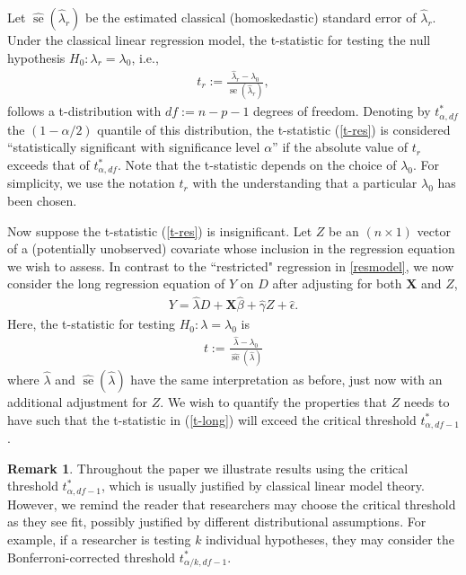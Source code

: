\documentclass[sts]{imsart}
\theoremstyle{plain}
\theoremstyle{definition}
\newtheorem{remark}{Remark}
\newcommand{\df}{df}
\DeclareMathOperator{\se}{\text{se}}
\begin{document}
Let $\widehat{\se}(\hat{\lambda}_r)$ be the estimated classical (homoskedastic) standard error of $\hat{\lambda}_r$. Under the classical linear regression model, the t-statistic for testing the null hypothesis \mbox{$H_0:\lambda_r = \lambda_0$}, i.e.,
\begin{align}
t_{r}:= \frac{\hat{\lambda}_r - \lambda_0}{\widehat{\se}(\hat{\lambda}_r)}, \label{t-res}
\end{align}
 follows a t-distribution with $\df:= n-p-1$ degrees of freedom. Denoting by $t^*_{\alpha, \df}$ the \mbox{$(1-\alpha/2)$} quantile of  this distribution, the t-statistic (\ref{t-res}) is considered ``statistically significant with significance level $\alpha$'' if the absolute value of $t_{r}$ exceeds that of $t^*_{\alpha, \df}$. 
 Note that the t-statistic depends on the choice of $\lambda_0$. For simplicity, we use the notation $t_r$ with the understanding that a particular $\lambda_0$ has been chosen.

Now suppose the t-statistic (\ref{t-res}) is insignificant. Let $Z$ be an $(n\times1)$ vector of a (potentially unobserved) covariate whose inclusion in the regression equation we wish to assess. In contrast to the ``restricted" regression in \eqref{resmodel}, we now consider the long regression equation of $Y$ on $D$ after adjusting for both $\mathbf{X}$ and $Z$,
\begin{align} 
    Y = \hat{\lambda}D + \mathbf{X}\hat{\beta} + \hat{\gamma}Z + \hat{\epsilon}.\label{regmodel}
\end{align}
Here, the t-statistic for testing \mbox{$H_0:\lambda = \lambda_0$} is
\begin{align}
t:= \frac{\hat{\lambda} - \lambda_0}{\widehat{\se}(\hat{\lambda})} \label{t-long}
\end{align}
where $\hat{\lambda}$ and $\widehat{\se}(\hat{\lambda})$ have the same interpretation as before, just now with an additional adjustment for $Z$. 
We wish to quantify the properties that $Z$ needs to have such that the t-statistic in (\ref{t-long}) will exceed the critical threshold $t^*_{\alpha, \df-1}$.

\begin{remark}
\label{rmk:multiple}
Throughout the paper we illustrate results using the critical threshold $t^*_{\alpha, \df-1}$, which is usually justified by classical linear model theory. However, we remind the reader that researchers may choose the critical threshold as they see fit, possibly justified by different distributional assumptions. For example, if a researcher is testing $k$ individual hypotheses, they may consider the Bonferroni-corrected threshold $t^*_{\alpha/k, \df-1}$.
\end{remark}
\end{document}
